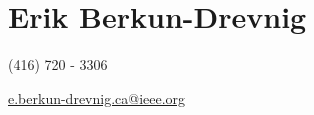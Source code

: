 \noindent
\begin{minipage}[t]{0.6\textwidth}
\section{Erik Berkun-Drevnig}
\end{minipage}
\begin{minipage}[b]{0.4\textwidth}
\begin{flushright}
(416) 720 - 3306\par
\href{mailto:e.berkun-drevnig.ca@ieee.org}{e.berkun-drevnig.ca@ieee.org}
\end{flushright}
\end{minipage}
\smallskip